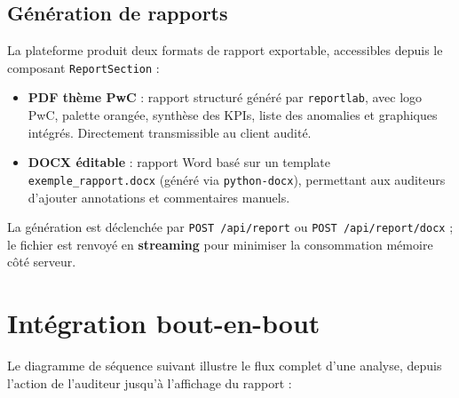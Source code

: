 \documentclass[12pt,a4paper,twoside]{report}
\begin{document}
\subsection{Génération de rapports}

La plateforme produit deux formats de rapport exportable, accessibles depuis le composant \texttt{ReportSection} :

\begin{itemize}
  \item \textbf{PDF thème PwC} : rapport structuré généré par \texttt{reportlab}, avec logo PwC, palette orangée, synthèse des KPIs, liste des anomalies et graphiques intégrés. Directement transmissible au client audité.
  \item \textbf{DOCX éditable} : rapport Word basé sur un template \texttt{exemple\_rapport.docx} (généré via \texttt{python-docx}), permettant aux auditeurs d'ajouter annotations et commentaires manuels.
\end{itemize}

La génération est déclenchée par \texttt{POST /api/report} ou \texttt{POST /api/report/docx} ; le fichier est renvoyé en \textbf{streaming} pour minimiser la consommation mémoire côté serveur.


\section{Intégration bout-en-bout}

Le diagramme de séquence suivant illustre le flux complet d'une analyse, depuis l'action de l'auditeur jusqu'à l'affichage du rapport :
\end{document}
